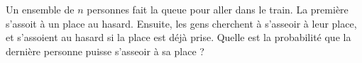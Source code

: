 Un ensemble de $n$ personnes fait la queue pour aller dans le train. La première s'assoit à un place au hasard. Ensuite, les gens cherchent à s'asseoir à leur place, et s'assoient au hasard si la place est déjà prise. Quelle est la probabilité que la dernière personne puisse s'asseoir à sa place ?
